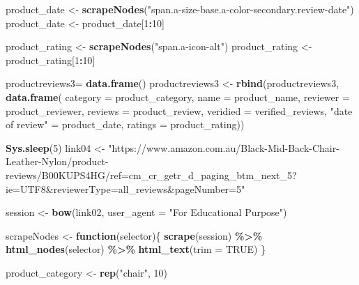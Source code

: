 \documentclass[
]{article}
\newenvironment{Shaded}{\begin{snugshade}}{\end{snugshade}}
\newcommand{\AttributeTok}[1]{\textcolor[rgb]{0.13,0.29,0.53}{#1}}
\newcommand{\ConstantTok}[1]{\textcolor[rgb]{0.56,0.35,0.01}{#1}}
\newcommand{\ControlFlowTok}[1]{\textcolor[rgb]{0.13,0.29,0.53}{\textbf{#1}}}
\newcommand{\DecValTok}[1]{\textcolor[rgb]{0.00,0.00,0.81}{#1}}
\newcommand{\FunctionTok}[1]{\textcolor[rgb]{0.13,0.29,0.53}{\textbf{#1}}}
\newcommand{\NormalTok}[1]{#1}
\newcommand{\OtherTok}[1]{\textcolor[rgb]{0.56,0.35,0.01}{#1}}
\newcommand{\SpecialCharTok}[1]{\textcolor[rgb]{0.81,0.36,0.00}{\textbf{#1}}}
\newcommand{\StringTok}[1]{\textcolor[rgb]{0.31,0.60,0.02}{#1}}
\begin{document}
\begin{Shaded}
\begin{Highlighting}[]
\NormalTok{  product\_date }\OtherTok{\textless{}{-}} \FunctionTok{scrapeNodes}\NormalTok{(}\StringTok{"span.a{-}size{-}base.a{-}color{-}secondary.review{-}date"}\NormalTok{)}
\NormalTok{  product\_date }\OtherTok{\textless{}{-}}\NormalTok{ product\_date[}\DecValTok{1}\SpecialCharTok{:}\DecValTok{10}\NormalTok{]}
  
\NormalTok{  product\_rating }\OtherTok{\textless{}{-}} \FunctionTok{scrapeNodes}\NormalTok{(}\StringTok{"span.a{-}icon{-}alt"}\NormalTok{)}
\NormalTok{  product\_rating }\OtherTok{\textless{}{-}}\NormalTok{ product\_rating[}\DecValTok{1}\SpecialCharTok{:}\DecValTok{10}\NormalTok{]}
  
\NormalTok{  productreviews3}\OtherTok{=} \FunctionTok{data.frame}\NormalTok{()}
\NormalTok{  productreviews3 }\OtherTok{\textless{}{-}} \FunctionTok{rbind}\NormalTok{(productreviews3, }\FunctionTok{data.frame}\NormalTok{(}
                      \AttributeTok{category =}\NormalTok{ product\_category,}
                      \AttributeTok{name =}\NormalTok{ product\_name,}
                      \AttributeTok{reviewer =}\NormalTok{ product\_reviewer,}
                      \AttributeTok{reviews =}\NormalTok{ product\_review,}
                      \AttributeTok{veridied =}\NormalTok{ verified\_reviews,}
                      \StringTok{"date of review"} \OtherTok{=}\NormalTok{ product\_date,}
                      \AttributeTok{ratings =}\NormalTok{ product\_rating))}
  
   \FunctionTok{Sys.sleep}\NormalTok{(}\DecValTok{5}\NormalTok{)}
\NormalTok{link04 }\OtherTok{\textless{}{-}} \StringTok{"https://www.amazon.com.au/Black{-}Mid{-}Back{-}Chair{-}Leather{-}Nylon/product{-}reviews/B00KUPS4HG/ref=cm\_cr\_getr\_d\_paging\_btm\_next\_5?ie=UTF8\&reviewerType=all\_reviews\&pageNumber=5"}


\NormalTok{  session }\OtherTok{\textless{}{-}} \FunctionTok{bow}\NormalTok{(link02,}
               \AttributeTok{user\_agent =} \StringTok{"For Educational Purpose"}\NormalTok{)}

\NormalTok{  scrapeNodes }\OtherTok{\textless{}{-}} \ControlFlowTok{function}\NormalTok{(selector)\{}
    \FunctionTok{scrape}\NormalTok{(session) }\SpecialCharTok{\%\textgreater{}\%}
      \FunctionTok{html\_nodes}\NormalTok{(selector) }\SpecialCharTok{\%\textgreater{}\%}
      \FunctionTok{html\_text}\NormalTok{(}\AttributeTok{trim =} \ConstantTok{TRUE}\NormalTok{)}
\NormalTok{  \}}

\NormalTok{  product\_category }\OtherTok{\textless{}{-}} \FunctionTok{rep}\NormalTok{(}\StringTok{"chair"}\NormalTok{, }\DecValTok{10}\NormalTok{)}


\end{Highlighting}
\end{Shaded}
\end{document}
